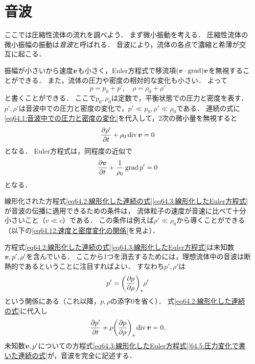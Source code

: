 \section{音波}
\label{sec:64}

ここでは圧縮性流体の流れを調べよう．
まず微小振動を考える．
圧縮性流体の微小振幅の振動は\emph{音波}と呼ばれる．
音波により，流体の各点で濃縮と希薄が交互に起こる．


振幅が小さいから速度$\vb*{v}$も小さく，Euler方程式で移流項$(\vb*{v}\cdot\operatorname{grad})\vb*{v}$を無視することができる．
また，流体の圧力や密度の相対的な変化も小さい．
よって
\begin{equation}\label{eq64.1:音波中での圧力と密度の変化}
    p = p_0 + p', \quad \rho = \rho_0 + \rho'
\end{equation}
と書くことができる．
ここで$p_0, \rho_0$は定数で，平衡状態での圧力と密度を表す．
$p', \rho'$は音波中での圧力と密度の変化で，$p' \ll p_0, \rho' \ll \rho_0$である．
連続の式に\eqref{eq64.1:音波中での圧力と密度の変化}を代入して，2次の微小量を無視すると
\begin{equation}\label{eq64.2:線形化した連続の式}
    \pdv{\rho'}{t} + \rho_0 \operatorname{div}\vb*{v} = 0
\end{equation}
となる．
Euler方程式は，同程度の近似で
\begin{equation}\label{eq64.3:線形化したEuler方程式}
    \pdv{\vb*{v}}{t} + \frac{1}{\rho_0} \operatorname{grad} p' = 0
\end{equation}
となる．


線形化された方程式\eqref{eq64.2:線形化した連続の式}\eqref{eq64.3:線形化したEuler方程式}が音波の伝播に適用できるための条件は，
流体粒子の速度が音速に比べて十分小さいこと（$v \ll c$）である．
この条件は例えば$\rho' \ll \rho_0$から導くことができる（以下の\eqref{eq64.12:速度と密度変化の関係}を見よ）．


方程式\eqref{eq64.2:線形化した連続の式}\eqref{eq64.3:線形化したEuler方程式}は未知数$\vb*{v}, p', \rho'$を含んでいる．
ここから1つを消去するためには，理想流体中の音波は断熱的であるということに注目すればよい．
すなわち$p', \rho'$は
\begin{equation}\label{eq64.4:圧力変化と密度変化の関係}
    p' = \PDV{p}{\rho}{s} \rho'
\end{equation}
という関係にある（これ以降，$p,\rho$の添字0を省く）．
式\eqref{eq64.2:線形化した連続の式}に代入し
\begin{equation}\label{64.5:圧力変化で書いた連続の式}
    \pdv{p'}{t} + \rho \PDV{p}{\rho}{s} \Div \v = 0.
\end{equation}
未知数$\vb*{v},p'$についての方程式\eqref{eq64.3:線形化したEuler方程式}\eqref{64.5:圧力変化で書いた連続の式}が，音波を完全に記述する．


